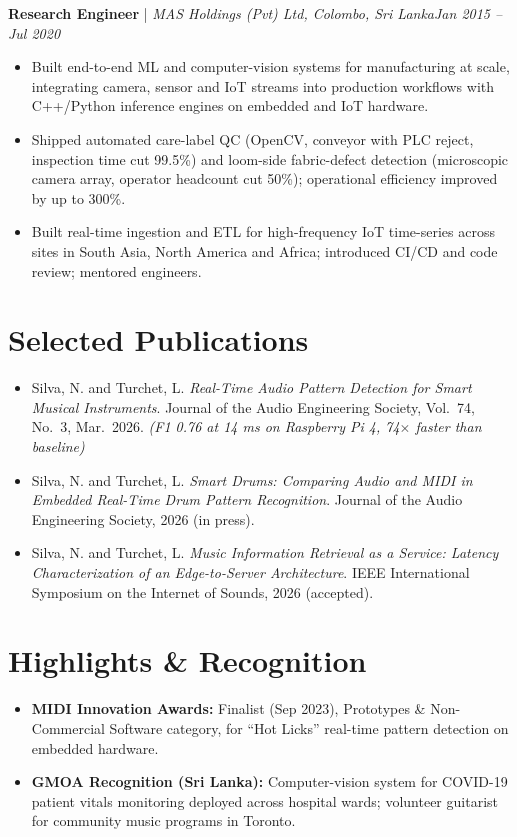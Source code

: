 \documentclass[11pt]{article}
\newenvironment{cvrole}[5]{%
  \par\noindent\textbf{\large #1} | \textit{\small #2, #3}\hfill \textit{\small #4 -- #5}\par
  \begin{itemize}[leftmargin=2em, itemsep=-0.3em, topsep=-0.5em]%
}{%
  \end{itemize}\par\noindent\mbox{}\par\vspace{0.1em}%
}
\begin{document}
\begin{cvrole}{Research Engineer}{MAS Holdings (Pvt) Ltd}{Colombo, Sri Lanka}{Jan 2015}{Jul 2020}
    \item Built end-to-end ML and computer-vision systems for manufacturing at scale, integrating camera, sensor and IoT streams into production workflows with C++/Python inference engines on embedded and IoT hardware.
    \item Shipped automated care-label QC (OpenCV, conveyor with PLC reject, inspection time cut 99.5\%) and loom-side fabric-defect detection (microscopic camera array, operator headcount cut 50\%); operational efficiency improved by up to 300\%.
    \item Built real-time ingestion and ETL for high-frequency IoT time-series across sites in South Asia, North America and Africa; introduced CI/CD and code review; mentored engineers.
\end{cvrole}

\enlargethispage{3\baselineskip}
\section*{Selected Publications \footnotesize {}}
\begin{itemize}[leftmargin=1.2em, itemsep=-0.25em]
    \item Silva, N. and Turchet, L. \textit{Real-Time Audio Pattern Detection for Smart Musical Instruments}. Journal of the Audio Engineering Society, Vol.~74, No.~3, Mar.~2026. \textit{(F1 0.76 at 14 ms on Raspberry Pi 4, 74$\times$ faster than baseline)}
    \item Silva, N. and Turchet, L. \textit{Smart Drums: Comparing Audio and MIDI in Embedded Real-Time Drum Pattern Recognition}. Journal of the Audio Engineering Society, 2026 (in press).
    \item Silva, N. and Turchet, L. \textit{Music Information Retrieval as a Service: Latency Characterization of an Edge-to-Server Architecture}. IEEE International Symposium on the Internet of Sounds, 2026 (accepted).
\end{itemize}

\vspace{-0.3em}
\section*{Highlights \& Recognition}
\begin{itemize}[leftmargin=1.2em, itemsep=-0.25em]
    \item \textbf{MIDI Innovation Awards:} Finalist (Sep 2023), Prototypes \& Non-Commercial Software category, for ``Hot Licks'' real-time pattern detection on embedded hardware.
    \item \textbf{GMOA Recognition (Sri Lanka):} Computer-vision system for COVID-19 patient vitals monitoring deployed across hospital wards; volunteer guitarist for community music programs in Toronto.
\end{itemize}
\end{document}
